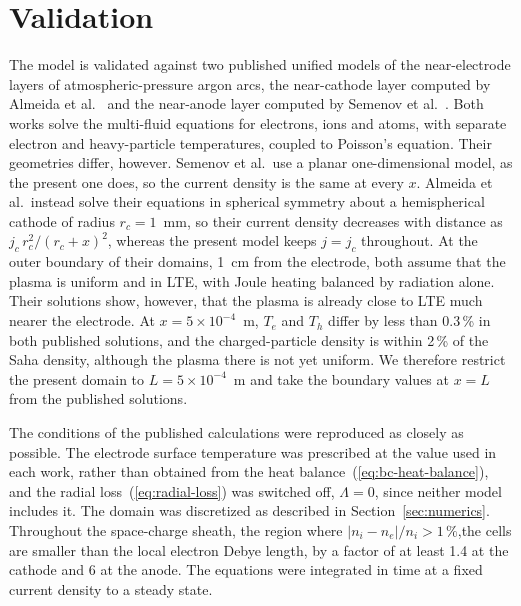 \section{Validation}
\label{sec:validation}

The model is validated against two published unified models of the near-electrode layers of atmospheric-pressure argon arcs, the near-cathode layer computed by Almeida et al.\ \cite{Almeida2008} and the near-anode layer computed by Semenov et al.\ \cite{semenov2016numerical}. Both works solve the multi-fluid equations for electrons, ions and atoms, with separate electron and heavy-particle temperatures, coupled to Poisson's equation. Their geometries differ, however. Semenov et al.\ use a planar one-dimensional model, as the present one does, so the current density is the same at every \(x\). Almeida et al.\ instead solve their equations in spherical symmetry about a hemispherical cathode of radius \(r_c=1\)~mm, so their current density decreases with distance as \(j_c\,r_c^2/(r_c+x)^2\), whereas the present model keeps \(j=j_c\) throughout. At the outer boundary of their domains, 1~cm from the electrode, both assume that the plasma is uniform and in LTE, with Joule heating balanced by radiation alone. Their solutions show, however, that the plasma is already close to LTE much nearer the electrode. At \(x=5\times10^{-4}\)~m, \(T_e\) and \(T_h\) differ by less than 0.3\,\% in both published solutions, and the charged-particle density is within 2\,\% of the Saha density, although the plasma there is not yet uniform. We therefore restrict the present domain to \(L=5\times10^{-4}\)~m and take the boundary values at \(x=L\) from the published solutions.

The conditions of the published calculations were reproduced as closely as possible. The electrode surface temperature was prescribed at the value used in each work, rather than obtained from the heat balance~(\ref{eq:bc-heat-balance}), and the radial loss~(\ref{eq:radial-loss}) was switched off, \(\Lambda=0\), since neither model includes it. The domain was discretized as described in Section~\ref{sec:numerics}. Throughout the space-charge sheath, the region where \(|n_i-n_e|/n_i>1\,\%\),the cells are smaller than the local electron Debye length, by a factor of at least 1.4 at the cathode and 6 at the anode. The equations were integrated in time at a fixed current density to a steady state.

